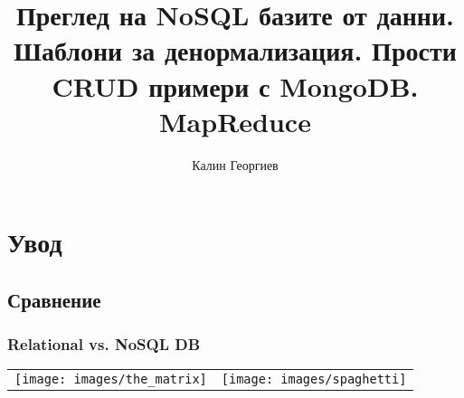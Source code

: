 \documentclass{beamer}
\begin{document}
\title[MongoDB]{Преглед на NoSQL базите от данни. Шаблони за денормализация. Прости CRUD примери с MongoDB. MapReduce}
\author{Калин Георгиев}
\frame{\titlepage}

\section{Увод}
\subsection{Сравнение}


\begin{frame}[fragile]
\frametitle{Relational  vs. NoSQL DB}

\begin{center}

\begin{tabular}{ c | c }

\texttt{[image: images/the\_matrix]}

&

\texttt{[image: images/spaghetti]}

\end{tabular}

\end{center}


\end{frame}
\end{document}
